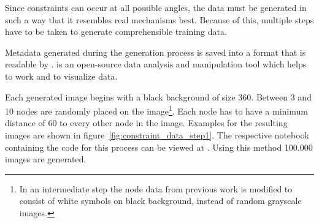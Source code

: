 Since constraints can occur at all possible angles, the data must be generated in such a way that it resembles real mechanisms best.
Because of this, multiple steps have to be taken to generate comprehensible training data.

Metadata generated during the generation process is saved into a format that is readable by . %
 is an open-source data analysis and manipulation tool which helps to work and to visualize data.

Each generated image begins with a black background of size 360.
Between 3 and 10 nodes are randomly placed on the image\footnote{In an intermediate step the node data from previous work is modified to consist of white symbols on black background, instead of random grayscale images.}.
Each node has to have a minimum distance of 60 to every other node in the image.
Examples for the resulting images are shown in figure~\ref{fig:constraint_data_step1}.
The respective notebook containing the code for this process can be viewed at .
Using this method 100.000 images are generated.

